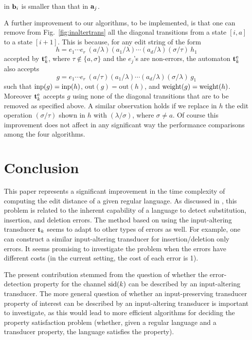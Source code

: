 \documentclass{article}
\theoremstyle{plain}
\theoremstyle{definition}
\theoremstyle{remark}
\newcommand{\e}{\lambda}
\newcommand\tsid{\trt_{k}}
\newcommand\out{\mathrm{out}}
\newcommand\pbsn{\par\bigskip\noindent}
\begin{document}
in $\mathbf{b}_i$ is smaller than that in $\mathbf{a}_j$.
\pbsn
A further improvement to our algorithms, to be implemented, is that one can
remove from Fig.~\ref{fig:inaltertrans} all the diagonal transitions
from a state $[i,a]$ to a state $[i+1]$. This is because,
for any edit string of the form
\[
h=e_1\cdots e_r\>(a/\e)(a_1/\e)\cdots(a_d/\e)(\sigma/\tau)\>h_1
\]
accepted by $\mathbf{t}^{\mathrm{e}}_k$, where $\tau\notin\{a,\sigma\}$ and
the $e_j$'s are non-errors, the
automaton $\mathbf{t}^{\mathrm{e}}_k$ also accepts
\[
g=e_1\cdots e_r\>(a/\tau)(a_1/\e)\cdots(a_d/\e)(\sigma/\e)\>g_1
\]
such that $\mathrm{inp}(g)=\mathrm{inp}(h)$, $\out(g)=\out(h)$, and
$\mathrm{weight}(g)=\mathrm{weight}(h)$. Moreover $\mathbf{t}^{\mathrm{e}}_k$ accepts
$g$ using none of the diagonal transitions that are
to be removed as specified above.
A similar observation holds if we replace in $h$ the edit
operation $(\sigma/\tau)$ shown in $h$ with $(\e/\sigma)$,
where $\sigma\not=a$.
Of course this improvement does not affect in any significant
way the performance comparisons among the four algorithms.


\section{Conclusion}\label{sec:last}
This paper represents a significant improvement in  the
time complexity of computing the edit distance of a given regular language.
As discussed in \cite{Kon:2007}, this problem is related to
the inherent capability of a language to detect substitution,
insertion, and deletion errors. The method based on using the input-altering transducer $\tsid$
seems to adapt to other types of errors as well.
For example, one can construct a similar input-altering transducer for insertion/deletion only errors. It seems
promising to investigate the problem when the errors
have different costs (in the current setting, the cost of
each error is 1).

The present contribution stemmed from the
question of whether the error-detection property for
the channel  $\mathrm{sid}(k)$ can be described by an
input-altering transducer. The more general question
of whether an input-preserving transducer property of
interest can be described by an input-altering transducer is important to investigate, as this would lead to more
efficient algorithms for deciding the property
satisfaction problem (whether, given a regular language
and a transducer property, the language satisfies the property).







\end{document}
